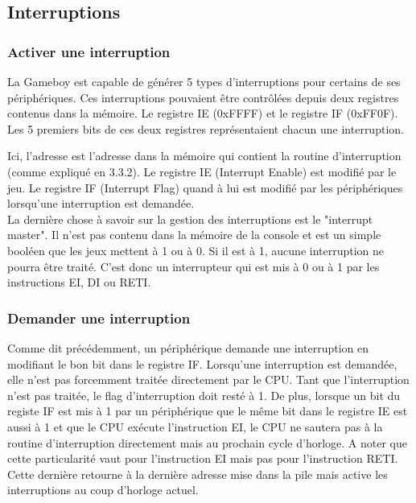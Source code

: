 \documentclass[a4paper]{article}
\begin{document}

\subsection{Interruptions}

\subsubsection{Activer une interruption}
La Gameboy est capable de générer 5 types d'interruptions pour certains de ses
périphériques. Ces interruptions pouvaient être contrôlées depuis deux registres
contenus dans la mémoire. Le registre IE (0xFFFF) et le registre IF (0xFF0F).
Les 5 premiers bits de ces deux registres représentaient chacun une interruption.
\begin{center}
\end{center}
Ici, l'adresse est l'adresse dans la mémoire qui contient la routine d'interruption
(comme expliqué en 3.3.2). Le registre IE (Interrupt Enable) est modifié par le jeu.
Le registre IF (Interrupt Flag) quand à lui est modifié par les périphériques lorsqu'une 
interruption est demandée. \\

La dernière chose à savoir sur la gestion des interruptions est le "interrupt master".
Il n'est pas contenu dans la mémoire de la console et est un simple booléen que les
jeux mettent à 1 ou à 0. Si il est à 1, aucune interruption ne pourra être traité.
C'est donc un interrupteur qui est mis à 0 ou à 1 par les instructions EI, DI ou RETI.

\subsubsection{Demander une interruption}
Comme dit précédemment, un périphérique demande une interruption en modifiant le
bon bit dans le registre IF. Lorsqu'une interruption est demandée, elle n'est pas
forcemment traitée directement par le CPU. Tant que l'interruption n'est pas traitée,
le flag d'interruption doit resté à 1. De plus, lorsque un bit du registe IF est mis
à 1 par un périphérique que le même bit dans le registre IE est aussi à 1 et que
le CPU exécute l'instruction EI, le CPU ne sautera pas à la routine d'interruption
directement mais au prochain cycle d'horloge. A noter que cette particularité vaut 
pour l'instruction EI mais pas pour l'instruction RETI. Cette dernière retourne à
la dernière adresse mise dans la pile mais active les interruptions au coup d'horloge
actuel. \\
\end{document}
